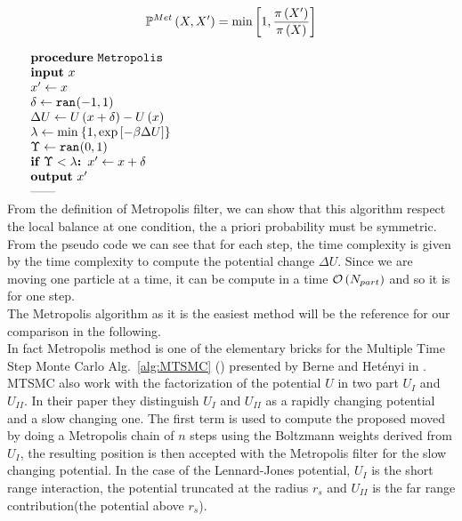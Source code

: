 \documentclass[jcp,twocolumn,longbibliography,superscriptaddress]{revtex4-2}
\newcommand{\prog}[1]{Alg.~\ref{alg:#1} (\sub{#1})}
\newcommand{\Npart}{N_{part}}
\begin{document}
	\begin{equation}
		\label{eq : Metropolis}
		\mathbb{P}^{Met}\left( X, X'\right) = \min^{} \left[ 1, \frac{\pi \left( X'\right)}{\pi \left( X\right)} \right]
	\end{equation}
	
	\begin{algorithm}[htb]
		\newcommand{\algo}{Metropolis}
		\captionsetup{margin=0pt,justification=raggedright}
		\begin{center}
			$\begin{array}{ll}
				& \PROCEDURE{\algo}\\
				& \INPUT{x}\\
				& \IS{x'}{x}\\
				& \IS{\delta}{\ranb{-1,1}}\\
				& \IS{\Delta U}{U\glb x+\delta \grb - U\glb x \grb }\\
				& \IS{\lambda}{\mind{1, \expc{-\beta \Delta U}}}\\
				& \IS{\Upsilon}{\ranb{0,1}}\\
				& \IF{\Upsilon < \lambda} \IS{x'}{x + \delta}\\
				& \OUTPUT{x'}\\
				& \ENDPROCEDURE\
			\end{array}$
		\end{center}
		\caption{\sub{\algo}.}
		\label{alg:\algo}
	\end{algorithm}
	
	From the definition of Metropolis filter, we can show that this algorithm respect the local balance at one condition, the a priori probability must be symmetric.\\
	From the pseudo code we can see that for each step, the time complexity is given by the time complexity to compute the potential change $\Delta U$. Since we are moving one particle at a time, it can be compute in a time $\OCAL \glb\Npart\grb$ and so it is for one step.\\
		
	The Metropolis algorithm as it is the easiest method will be the reference for our comparison in the following.\\
	
	In fact Metropolis method is one of the elementary bricks for the Multiple Time Step Monte Carlo \prog{MTSMC} presented by Berne and Hetényi in \cite{Berne2002}. MTSMC also work with the factorization of the potential $U$ in two part $U_I$ and $U_{II}$.
	In their paper they distinguish $U_I$ and $U_{II}$ as a rapidly changing potential and a slow changing one. The first term is used to compute the proposed moved by doing a Metropolis chain of $n$ steps using the Boltzmann weights derived from $U_I$, the resulting position is then accepted with the Metropolis filter for the slow changing potential. In the case of the Lennard-Jones potential, $U_I$ is the short range interaction, the potential truncated at the radius $r_s$ and $U_{II}$ is the far range contribution(the potential above $r_s$).
	
\end{document}
